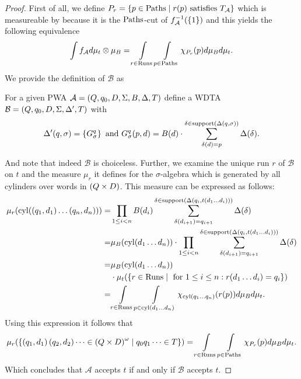 \begin{proof}
  First of all, we define
  $P_{r} = \left\{p\in\operatorname{Paths}\mid r(p) \text{ satisfies } T_{\mathcal{A}}\right\}$ which
  is measureable by \cite[Lemma 23.1]{Bauer} because it is the $\operatorname{Paths}$-cut of
  $f_{\mathcal{A}}^{-1}(\left\{1\right\})$ and this yields the following equivalence
  \begin{equation*}
    \int f_{\mathcal{A}} d\mu_{t}\otimes\mu_{B} =
    \int\limits_{r\in\operatorname{Runs}}\int\limits_{p\in\operatorname{Paths}}\chi_{P_{r}}(p)
    d\mu_{B} d\mu_{t}.
  \end{equation*}
  We provide the definition of $\mathcal{B}$ as
  \begin{definition}
    For a given \ac{PWA}
    $\mathcal{A} = \left(Q, q_{0}, D, \Sigma, B, \Delta, T\right)$ define a \ac{WDTA}
    $\mathcal{B} = \left(Q, q_{0}, D, \Sigma, \Delta', T\right)$ with
    \begin{equation*}
      \Delta'(q,\sigma) = \left\{G_{\sigma}^{q}\right\}
      \text{ and }
      G_{\sigma}^{q}(p, d) = B(d)\cdot\sum^{\delta\in\operatorname{support}(\Delta(q,\sigma))}_{
      \delta(d) = p}\Delta(\delta).
    \end{equation*} 
  \end{definition}
  And note that indeed $\mathcal{B}$ is choiceless. Further, we examine the
  unique run $r$ of $\mathcal{B}$ on $t$ and the measure $\mu_{r}$ it defines
  for the $\sigma$-algebra which is generated by all cylinders over words in
  $\left(Q\times D\right)$. This measure can be expressed as follows:
  \begin{align*}
    \mu_{r}(\operatorname{cyl}(\left(q_{1},d_{1}\right)\dots\left(q_{n},d_{n}\right)))
    = &\prod\limits_{1\leq i<n} B(d_{i})\sum\limits^{
      \delta\in\operatorname{support}(\Delta(q_{i},t(d_{1}\dots d_{i})))}_{\delta(d_{i+1}) =
      q_{i+1}}\Delta(\delta)\\
    = &\mu_{B}(\operatorname{cyl}(d_{1}\dots d_{n}))\cdot\prod\limits_{1\leq i<n}\sum\limits^{
      \delta\in\operatorname{support}(\Delta(q_{i},t(d_{1}\dots d_{i})))}_{\delta(d_{i+1}) =
      q_{i+1}}\Delta(\delta)\\
    = &\mu_{B}(\operatorname{cyl}(d_{1}\dots d_{n}))\\
      &\cdot\mu_{t}(\left\{r\in\operatorname{Runs}\mid\text{ for }1\leq i\leq n:r(d_{1}\dots d_{i}) = q_{i}\right\})\\
    = &\int\limits_{r\in\operatorname{Runs}}\int\limits_{p\in\operatorname{cyl}(d_{1}\dots d_{n})}
        \chi_{\operatorname{cyl}(q_{1}\dots q_{n})}(r(p))d\mu_{B} d\mu_{t}.
  \end{align*}
  Using this expression it follows that
  \begin{equation*}
    \mu_{r}(\left\{\left(q_{1},d_{1}\right)\left(q_{2},d_{2}\right)\dots\in\left(Q\times D\right)^{\omega}\mid q_{0}q_{1}\dots\in T\right\})
    =\int\limits_{r\in\operatorname{Runs}}\int\limits_{p\in\operatorname{Paths}}\chi_{P_{r}}(p)d\mu_{B} d\mu_{t}.
  \end{equation*}
  Which concludes that $\mathcal{A}$ accepts $t$ if and only if $\mathcal{B}$
  accepts $t$.
\end{proof}
